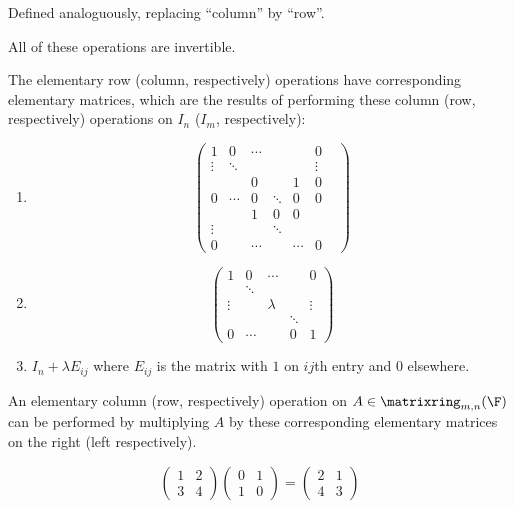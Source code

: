\documentclass[a4paper]{article}
\newcommand*{\M}{\matrixring}
\theoremstyle{definition}
\begin{document}
\begin{definition}
  Defined analoguously, replacing ``column'' by ``row''.
\end{definition}

\begin{note}
  All of these operations are invertible.
\end{note}

\begin{definition}
The elementary row (column, respectively) operations have corresponding elementary matrices, which are the results of performing these column (row, respectively) operations on \(I_n\) (\(I_m\), respectively):
\begin{enumerate}
\item
  \[
    \begin{pmatrix}
      1 & 0 & \cdots & & & 0 \\
      \vdots & \ddots & & & & \vdots \\
      & & 0 & & 1 & 0 \\
      0 & \cdots & 0 & \ddots & 0 & 0 \\
      & & 1 & 0 & 0 & & \\
      \vdots & & &  \ddots & \\
      0 & & \cdots & & \cdots & 0
    \end{pmatrix}
  \]
\item
  \[
    \begin{pmatrix}
      1 & 0 & \cdots & & 0 \\
       & \ddots & & & \\
      \vdots & & \lambda & & \vdots \\
       & & & \ddots & \\
      0 & \cdots & & 0 & 1
    \end{pmatrix}
  \]
\item \(I_n+\lambda E_{ij}\) where \(E_{ij}\) is the matrix with \(1\) on \(ij\)th entry and \(0\) elsewhere.
\end{enumerate}
\end{definition}

An elementary column (row, respectively) operation on \(A\in \M_{m,n}(\F)\) can be performed by multiplying \(A\) by these corresponding elementary matrices on the right (left respectively).

\begin{eg}
  \[
    \begin{pmatrix}
      1 & 2 \\ 3 & 4
    \end{pmatrix}
    \begin{pmatrix} 0 & 1 \\ 1 & 0 \end{pmatrix} = \begin{pmatrix} 2 & 1 \\ 4 & 3 \end{pmatrix}
  \]
\end{eg}
\end{document}
